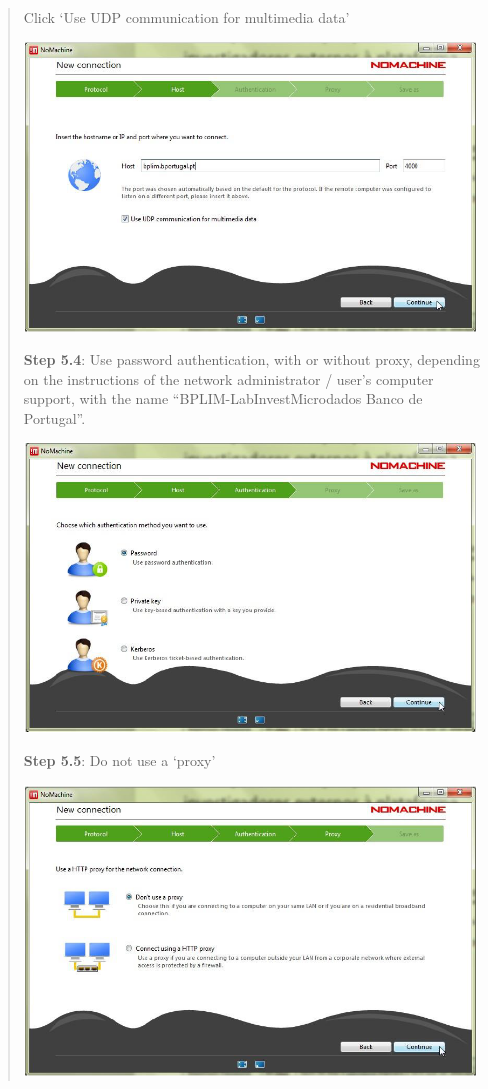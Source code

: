\documentclass[]{book}
\begin{document}
\begin{quote}
Click `Use UDP communication for multimedia data'

\includegraphics[width=4.72441in,height=3.02002in]{./media/image28.png}

\textbf{Step 5.4}: Use password authentication, with or without proxy,
depending on the instructions of the network administrator / user's
computer support, with the name ``BPLIM-LabInvestMicrodados Banco de
Portugal''.

\includegraphics[width=4.72441in,height=3.02438in]{./media/image29.png}

\textbf{Step 5.5}: Do not use a `proxy'

\includegraphics[width=4.72441in,height=3.03165in]{./media/image30.png}


\end{quote}
\end{document}

